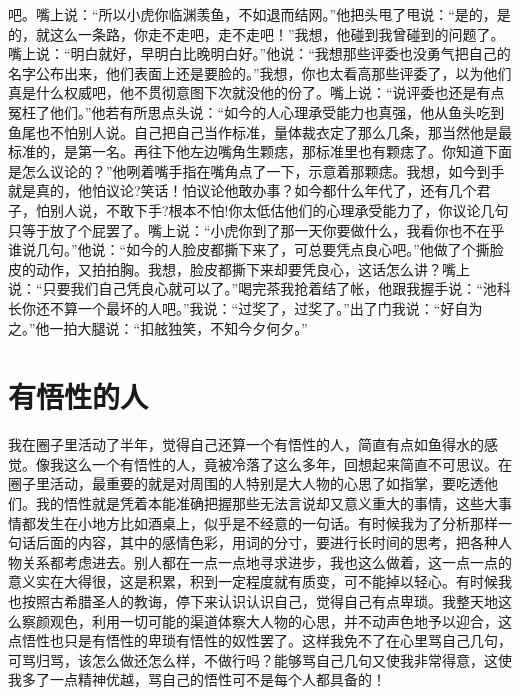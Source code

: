 \documentclass[12pt,oneside]{book}
\begin{document}
吧。嘴上说：``所以小虎你临渊羡鱼，不如退而结网。''他把头甩了甩说：``是的，是的，就这么一条路，你走不走吧，走不走吧！''我想，他碰到我曾碰到的问题了。嘴上说：``明白就好，早明白比晚明白好。''他说：``我想那些评委也没勇气把自己的名字公布出来，他们表面上还是要脸的。''我想，你也太看高那些评委了，以为他们真是什么权威吧，他不贯彻意图下次就没他的份了。嘴上说：``说评委也还是有点冤枉了他们。''他若有所思点头说：``如今的人心理承受能力也真强，他从鱼头吃到鱼尾也不怕别人说。自己把自己当作标准，量体裁衣定了那么几条，那当然他是最标准的，是第一名。再往下他左边嘴角生颗痣，那标准里也有颗痣了。你知道下面是怎么议论的？''他咧着嘴手指在嘴角点了一下，示意着那颗痣。我想，如今到手就是真的，他怕议论?笑话！怕议论他敢办事？如今都什么年代了，还有几个君子，怕别人说，不敢下手?根本不怕!你太低估他们的心理承受能力了，你议论几句只等于放了个屁罢了。嘴上说：``小虎你到了那一天你要做什么，我看你也不在乎谁说几句。''他说：``如今的人脸皮都撕下来了，可总要凭点良心吧。''他做了个撕脸皮的动作，又拍拍胸。我想，脸皮都撕下来却要凭良心，这话怎么讲？嘴上说：``只要我们自己凭良心就可以了。''喝完茶我抢着结了帐，他跟我握手说：``池科长你还不算一个最坏的人吧。''我说：``过奖了，过奖了。''出了门我说：``好自为之。''他一拍大腿说：``扣舷独笑，不知今夕何夕。''


\chapter{有悟性的人}

我在圈子里活动了半年，觉得自己还算一个有悟性的人，简直有点如鱼得水的感觉。像我这么一个有悟性的人，竟被冷落了这么多年，回想起来简直不可思议。在圈子里活动，最重要的就是对周围的人特别是大人物的心思了如指掌，要吃透他们。我的悟性就是凭着本能准确把握那些无法言说却又意义重大的事情，这些大事情都发生在小地方比如酒桌上，似乎是不经意的一句话。有时候我为了分析那样一句话后面的内容，其中的感情色彩，用词的分寸，要进行长时间的思考，把各种人物关系都考虑进去。别人都在一点一点地寻求进步，我也这么做着，这一点一点的意义实在大得很，这是积累，积到一定程度就有质变，可不能掉以轻心。有时候我也按照古希腊圣人的教诲，停下来认识认识自己，觉得自己有点卑琐。我整天地这么察颜观色，利用一切可能的渠道体察大人物的心思，并不动声色地予以迎合，这点悟性也只是有悟性的卑琐有悟性的奴性罢了。这样我免不了在心里骂自己几句，可骂归骂，该怎么做还怎么样，不做行吗？能够骂自己几句又使我非常得意，这使我多了一点精神优越，骂自己的悟性可不是每个人都具备的！
\end{document}
